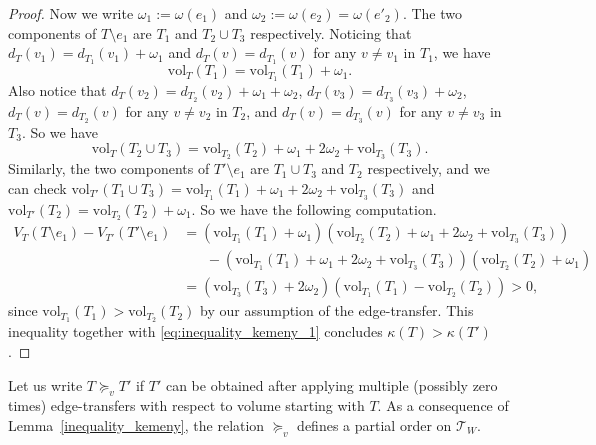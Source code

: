 \documentclass[11pt]{article}
\theoremstyle{definition}
\newcommand{\vol}{\text{vol}}
\begin{document}
\begin{proof}
Now we write $\omega_1:=\omega(e_1)$ and $\omega_2:=\omega(e_2)=\omega(e'_2)$. The two components of $T\setminus e_1$ are $T_1$ and $T_2\cup T_3$ respectively. Noticing that $d_T(v_1)=d_{T_1}(v_1)+\omega_1$ and $d_T(v)=d_{T_1}(v)$ for any $v\neq v_1$ in $T_1$, we have
   \[\vol_{T}(T_1)=\vol_{T_1}(T_1)+\omega_1.\]
Also notice that $d_{T}(v_2)=d_{T_2}(v_2)+\omega_1+\omega_2$, $d_{T}(v_3)=d_{T_3}(v_3)+\omega_2$, $d_T(v)=d_{T_2}(v)$ for any $v\neq v_2$ in $T_2$, and $d_T(v)=d_{T_3}(v)$ for any $v\neq v_3$ in $T_3$. So we have
    \[\vol_{T}(T_2\cup T_3)=\vol_{T_2}(T_2)+\omega_1+2\omega_2+\vol_{T_3}(T_3).\]
Similarly, the two components of $T'\setminus e_1$ are $T_1\cup T_3$ and $T_2$ respectively, and we can check $\vol_{T'}(T_1\cup T_3)=\vol_{T_1}(T_1)+\omega_1+2\omega_2+\vol_{T_3}(T_3)$ and $\vol_{T'}(T_2)=\vol_{T_2}(T_2)+\omega_1$. So we have the following computation.
\begin{align*}
    V_T(T\setminus e_1)-V_{T'}(T'\setminus e_1)&=(\vol_{T_1}(T_1)+\omega_1)(\vol_{T_2}(T_2)+\omega_1+2\omega_2+\vol_{T_3}(T_3))\\
    &\hspace{20pt}-(\vol_{T_1}(T_1)+\omega_1+2\omega_2+\vol_{T_3}(T_3))(\vol_{T_2}(T_2)+\omega_1)\\
    &=(\vol_{T_3}(T_3)+2\omega_2)(\vol_{T_1}(T_1)-\vol_{T_2}(T_2))>0,
\end{align*}since $\vol_{T_1}(T_1)>\vol_{T_2}(T_2)$ by our assumption of the edge-transfer. This inequality together with \eqref{eq:inequality_kemeny_1} concludes $\kappa(T)>\kappa(T')$.
\end{proof}

Let us write $T\succeq_v T'$ if $T'$ can be obtained after applying multiple (possibly zero times) edge-transfers with respect to volume starting with $T$. As a consequence of Lemma~\ref{inequality_kemeny}, the relation $\succeq_v$ defines a partial order on $\mathcal{T}_W$.
\end{document}
